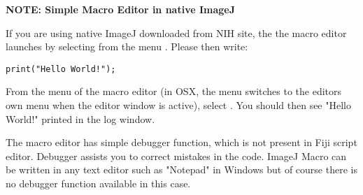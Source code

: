 \textbf{NOTE: Simple Macro Editor in native ImageJ}
\label{part:nativeeditor}

If you are using native ImageJ downloaded from NIH site, the the macro editor launches by selecting  from the menu . Please then write:

\verb+print("Hello World!");+

From the menu of the macro editor (in OSX, the menu switches to the editors own menu when the editor window is active), select . You should then see "Hello World!" printed in the log window.

The macro editor has simple debugger function, which is not present in Fiji script editor. Debugger assists you to correct mistakes in the code. ImageJ Macro can be written in any text editor such as "Notepad" in Windows but of course there is no debugger function available in this case.